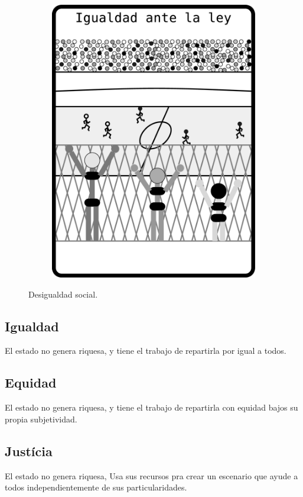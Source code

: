 \begin{figure}[ht!]
\begin{subfigure}{0.3\textwidth}
        \includegraphics[width=\textwidth]{caps/desigualdad/justicia.eps}
        \label{fig:justicia}
    \end{subfigure}
    \caption{Desigualdad social.}\label{fig:DesigualdadSocial}
\end{figure}

\subsection{Igualdad}

El estado no genera riquesa, y tiene el trabajo de repartirla por igual a todos.
\subsection{Equidad}
El estado no genera riquesa, y tiene el trabajo de repartirla con equidad bajos su propia subjetividad.
\subsection{Justícia}
El estado no genera riquesa, Usa sus recursos pra crear un escenario que ayude a todos
independientemente de sus particularidades.
